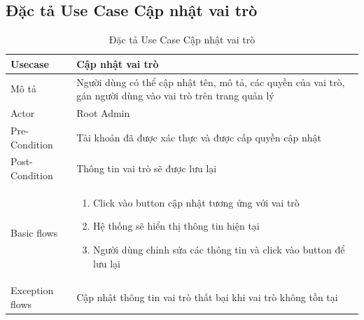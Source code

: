 \documentclass[../index.tex]{subfiles}
\begin{document}
    \subsection{Đặc tả Use Case Cập nhật vai trò}
    \begin{table}[H]
        \centering
        {}
        \begin{tabular}{ |p{3cm}|p{9cm}| }
            \hline
            Usecase         & Cập nhật vai trò                                                                                                                                                                                              \\
            \hline
            Mô tả           & Người dùng có thể cập nhật tên, mô tả, các quyền của vai trò, gán người dùng vào vai trò trên trang quản lý                                                                                                                 \\
            \hline
            Actor           & Root Admin                                                                                                                                                                                                    \\
            \hline
            Pre-Condition   & Tài khoản đã được xác thực và được cấp quyền cập nhật                                                                                                                                                         \\
            \hline
            Post-Condition  & Thông tin vai trò sẽ được lưu lại                                                                                                                                                                             \\
            \hline
            Basic flows     & \begin{enumerate}\item Click vào button cập nhật tương ứng với vai trò

\item Hệ thống sẽ hiển thị thông tin hiện tại

\item Người dùng chỉnh sửa các thông tin và click vào button để lưu lại\end{enumerate} \\
            \hline
            Exception flows & Cập nhật thông tin vai trò thất bại khi vai trò không tồn tại                                                                                                                                                              \\
            \hline
        \end{tabular}
        \caption{Đặc tả Use Case Cập nhật vai trò}
    \end{table}
\end{document}
